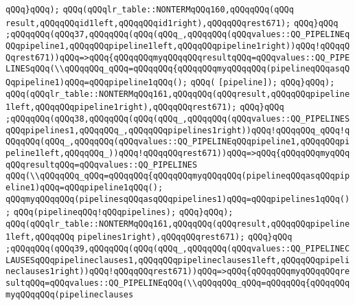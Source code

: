 \verb|qQQq}qQQq);|\newline
\verb|qQQq(qQQqlr_table::NONTERMqQQq160,qQQqqQQq(qQQq|\newline
\verb|result,qQQqqQQqid1left,qQQqqQQqid1right),qQQqqQQqrest671);|\newline
\verb|qQQq}qQQq|\newline
\verb|;qQQqqQQq(qQQq37,qQQqqQQq(qQQq(qQQq_,qQQqqQQq(qQQqvalues::QQ_PIPELINEqQQqpipeline1,qQQqqQQqpipeline1left,qQQqqQQqpipeline1right))qQQq!qQQqqQQqrest671))qQQq=>qQQq{qQQqqQQqmyqQQqqQQqresultqQQq=qQQqvalues::QQ_PIPELINESqQQq(\\qQQqqQQq_qQQq=qQQqqQQq{qQQqqQQqmyqQQqqQQq(pipelineqQQqasqQQqpipeline1)qQQq=qQQqpipeline1qQQq();|\newline
\verb|qQQq(|\newline
\verb|[pipeline]);|\newline
\verb|qQQq}qQQq);|\newline
\verb|qQQq(qQQqlr_table::NONTERMqQQq161,qQQqqQQq(qQQqresult,qQQqqQQqpipeline1left,qQQqqQQqpipeline1right),qQQqqQQqrest671);|\newline
\verb|qQQq}qQQq|\newline
\verb|;qQQqqQQq(qQQq38,qQQqqQQq(qQQq(qQQq_,qQQqqQQq(qQQqvalues::QQ_PIPELINESqQQqpipelines1,qQQqqQQq_,qQQqqQQqpipelines1right))qQQq!qQQqqQQq_qQQq!qQQqqQQq(qQQq_,qQQqqQQq(qQQqvalues::QQ_PIPELINEqQQqpipeline1,qQQqqQQqpipeline1left,qQQqqQQq_))qQQq!qQQqqQQqrest671))qQQq=>qQQq{qQQqqQQqmyqQQqqQQqresultqQQq=qQQqvalues::QQ_PIPELINES|\newline
\verb|qQQq(\\qQQqqQQq_qQQq=qQQqqQQq{qQQqqQQqmyqQQqqQQq(pipelineqQQqasqQQqpipeline1)qQQq=qQQqpipeline1qQQq();|\newline
\verb|qQQqmyqQQqqQQq(pipelinesqQQqasqQQqpipelines1)qQQq=qQQqpipelines1qQQq();|\newline
\verb|qQQq(pipelineqQQq!qQQqpipelines);|\newline
\verb|qQQq}qQQq);|\newline
\verb|qQQq(qQQqlr_table::NONTERMqQQq161,qQQqqQQq(qQQqresult,qQQqqQQqpipeline1left,qQQqqQQq|\newline
\verb|pipelines1right),qQQqqQQqrest671);|\newline
\verb|qQQq}qQQq|\newline
\verb|;qQQqqQQq(qQQq39,qQQqqQQq(qQQq(qQQq_,qQQqqQQq(qQQqvalues::QQ_PIPELINECLAUSESqQQqpipelineclauses1,qQQqqQQqpipelineclauses1left,qQQqqQQqpipelineclauses1right))qQQq!qQQqqQQqrest671))qQQq=>qQQq{qQQqqQQqmyqQQqqQQqresultqQQq=qQQqvalues::QQ_PIPELINEqQQq(\\qQQqqQQq_qQQq=qQQqqQQq{qQQqqQQqmyqQQqqQQq(pipelineclauses|\newline
